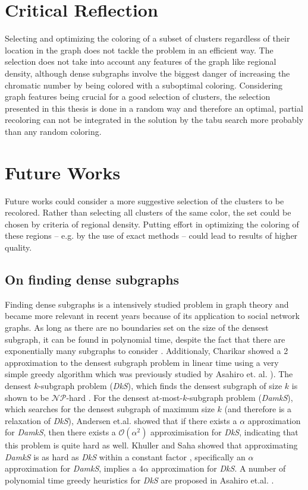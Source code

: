 \section{Critical Reflection}
Selecting and optimizing the coloring of a subset of clusters regardless of their location in the graph does not tackle the problem in an efficient way. The selection does not take into account any features of the graph like regional density, although dense subgraphs involve the biggest danger of increasing the chromatic number by being colored with a suboptimal coloring. Considering graph features being crucial for a good selection of clusters, the selection presented in this thesis is done in a random way and therefore an optimal, partial recoloring can not be integrated in the solution by the tabu search more probably than any random coloring.  

\section{Future Works}
Future works could consider a more suggestive selection of the clusters to be recolored. Rather than selecting all clusters of the same color, the set could be chosen by criteria of regional density. Putting effort in optimizing the coloring of these regions -- e.g. by the use of exact methods -- could lead to results of higher quality.

\subsection{On finding dense subgraphs}
Finding dense subgraphs is a intensively studied problem in graph theory and became more relevant in recent years because of its application to social network graphs. As long as there are no boundaries set on the size of the densest subgraph, it can be found in polynomial time, despite the fact that there are exponentially many subgraphs to consider \cite{lawler-76, asahiro-02}. Additionaly, Charikar \cite{charikar-00} showed a 2 approximation to the densest subgraph problem in linear time using a very simple greedy algorithm which was previously studied by Asahiro et. al. \cite{asahiroa-00}). The densest $k$-subgraph problem (\textit{DkS}), which finds the densest subgraph of size $k$ is shown to be $\mathcal{NP}$-hard \cite{feige-97,asahiro-02}. For the densest at-most-$k$-subgraph problem (\textit{DamkS}), which searches for the densest subgraph of maximum size $k$ (and therefore is a relaxation of \textit{DkS}), Andersen et.al. \cite{andersen-07} showed that if there exists a $\alpha$ approximation for \textit{DamkS}, then there exists a $\mathcal O(\alpha ^ 2)$ approximisation for \textit{DkS}, indicating that this problem is quite hard as well. Khuller and Saha showed that approximating \textit{DamkS} is as hard as \textit{DkS} within a constant factor \cite{khuller-09}, specifically an $\alpha$ approximation for \textit{DamkS}, implies a $4\alpha$ approximation for \textit{DkS}. A number of polynomial time greedy heuristics for \textit{DkS} are proposed in Asahiro et.al. \cite{asahiroa-00}.

